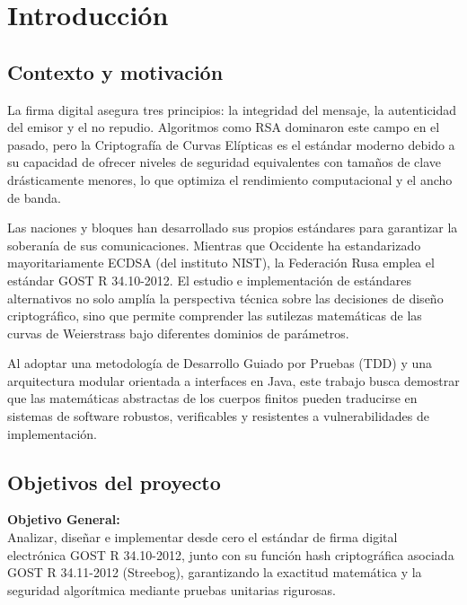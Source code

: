 \section{Introducción}

\subsection{Contexto y motivación}
La firma digital asegura tres principios: la integridad del mensaje, la autenticidad del emisor y el no repudio. Algoritmos como RSA dominaron este campo en el pasado, pero la Criptografía de Curvas Elípticas es el estándar moderno debido a su capacidad de ofrecer niveles de seguridad equivalentes con tamaños de clave drásticamente menores, lo que optimiza el rendimiento computacional y el ancho de banda.

Las naciones y bloques han desarrollado sus propios estándares para garantizar la soberanía de sus comunicaciones. Mientras que Occidente ha estandarizado mayoritariamente ECDSA (del instituto NIST), la Federación Rusa emplea el estándar GOST R 34.10-2012. El estudio e implementación de estándares alternativos no solo amplía la perspectiva técnica sobre las decisiones de diseño criptográfico, sino que permite comprender las sutilezas matemáticas de las curvas de Weierstrass bajo diferentes dominios de parámetros.

Al adoptar una metodología de Desarrollo Guiado por Pruebas (TDD) y una arquitectura modular orientada a interfaces en Java, este trabajo busca demostrar que las matemáticas abstractas de los cuerpos finitos pueden traducirse en sistemas de software robustos, verificables y resistentes a vulnerabilidades de implementación.

\subsection{Objetivos del proyecto}

\textbf{Objetivo General:} \\
Analizar, diseñar e implementar desde cero el estándar de firma digital electrónica GOST R 34.10-2012, junto con su función hash criptográfica asociada GOST R 34.11-2012 (Streebog), garantizando la exactitud matemática y la seguridad algorítmica mediante pruebas unitarias rigurosas.

